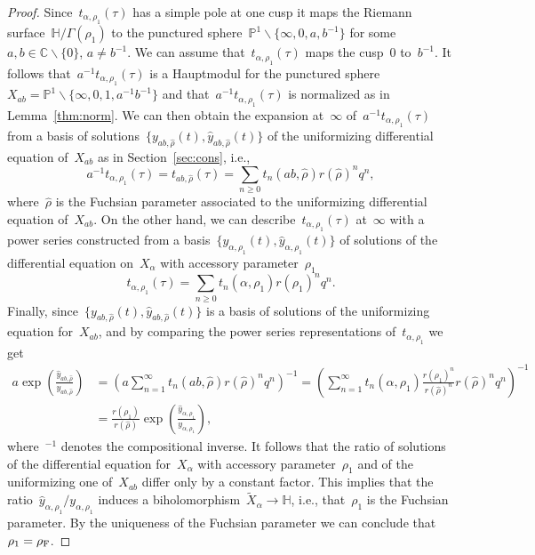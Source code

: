 \documentclass[pdftex]{sigma}
\newcommand{\C}{\mathbb{C}}
\newcommand{\pro}{\mathbb{P}}
\newcommand{\Po}{\mathbb{H}}
\numberwithin{equation}{section}
\begin{document}
\begin{proof}
Since~$t_{\alpha,\rho_1}(\tau)$ has a simple pole at one cusp it maps the Riemann surface~$\Po/\Gamma(\rho_1)$ to the punctured sphere~$\pro^1\smallsetminus\big\{\infty,0,a,b^{-1}\big\}$ for some~$a,b\in\C\smallsetminus\{0\}$, $a\neq b^{-1}$.
We can assume that~$t_{\alpha,\rho_1}(\tau)$ maps the cusp~$0$ to~$b^{-1}$. It follows that~$a^{-1}t_{\alpha,\rho_1}(\tau)$ is a Hauptmodul for the punctured sphere~$X_{ab}=\pro^1\smallsetminus\big\{\infty,0,1,a^{-1}b^{-1}\big\}$ and that~$a^{-1}t_{\alpha,\rho_1}(\tau)$ is normalized as in Lemma~\ref{thm:norm}. We can then obtain the expansion at~$\infty$ of~$a^{-1}t_{\alpha,\rho_1}(\tau)$ from a basis of solutions~$\{y_{ab,\hat{\rho}}(t),\hat{y}_{ab,\hat{\rho}}(t)\}$ of the uniformizing differential equation of~$X_{ab}$ as in Section~\ref{sec:cons}, i.e.,
\[
a^{-1}t_{\alpha,\rho_1}(\tau)=t_{ab,\hat{\rho}}(\tau)=\sum_{n\ge0}{t_n(ab,\hat{\rho})r(\hat{\rho})^nq^n} ,
\]
where~$\hat{\rho}$ is the Fuchsian parameter associated to the uniformizing differential equation of~$X_{ab}$.
On the other hand, we can describe~$t_{\alpha,\rho_1}(\tau)$ at~$\infty$ with a power series constructed from a basis~$\{y_{\alpha,\rho_1}(t),\hat{y}_{\alpha,\rho_1}(t)\}$ of solutions of the differential equation on~$X_\alpha$ with accessory parameter~$\rho_1$
\[
t_{\alpha,\rho_1}(\tau)=\sum_{n\ge0}{t_n(\alpha,\rho_1)r(\rho_1)^nq^n} .
\]
Finally, since~$\{y_{ab,\hat{\rho}}(t),\hat{y}_{ab,\hat{\rho}}(t)\}$ is a basis of solutions of the uniformizing equation for~$X_{ab}$, and by comparing the power series representations of~$t_{\alpha,\rho_1}$ we get
\begin{align*}
a\exp\left(\frac{\hat{y}_{ab,\hat{\rho}}}{y_{ab,\hat{\rho}}}\right)&=\left(a\sum_{n=1}^\infty{t_n(ab,\hat{\rho})r(\hat{\rho})^nq^n}\right)^{-1} =\left(\sum_{n=1}^\infty{{t_n(\alpha,\rho_1)}\frac{r(\rho_1)^n}{r(\hat{\rho})^n}r(\hat{\rho})^nq^n}\right)^{-1}\\ &=\frac{r(\rho_1)}{r(\hat{\rho})}\exp\left(\frac{\hat{y}_{\alpha,\rho_1}}{y_{\alpha,\rho_1}}\right) ,
\end{align*}
where~$^{-1}$ denotes the compositional inverse. It follows that the ratio of solutions of the differential equation for~$X_{\alpha}$ with accessory parameter~$\rho_1$ and of the uniformizing one of~$X_{ab}$ differ only by a constant factor. This implies that the ratio~$\hat{y}_{\alpha,\rho_1}/y_{\alpha,\rho_1}$ induces a biholomorphism~$\widetilde{X}_{\alpha}\rightarrow\Po$, i.e., that~$\rho_1$ is the Fuchsian parameter. By the uniqueness of the Fuchsian parameter we can conclude that~$\rho_1=\rho_{\rm F}$.
\end{proof}
\end{document}
